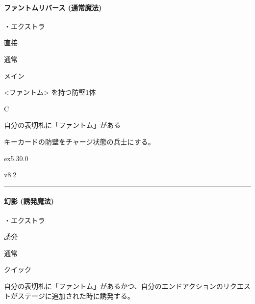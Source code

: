 \documentclass[letterpaper,10pt,dvipdfmx]{sphinxmanual}
\begin{document}
\paragraph{ファントムリバース (通常魔法)}
\label{\detokenize{auto/frameActionlist:act-phantomreverse}}\label{\detokenize{auto/frameActionlist:id40}}
\sphinxAtStartPar
{}

\sphinxAtStartPar
・エクストラ

\sphinxAtStartPar
{} 直接

\sphinxAtStartPar
{} 通常

\sphinxAtStartPar
{} メイン

\sphinxAtStartPar
{} \textless{}ファントム\textgreater{} を持つ防壁1体

\sphinxAtStartPar
{} C

\sphinxAtStartPar
{}

\sphinxAtStartPar
自分の表切札に「ファントム」がある

\sphinxAtStartPar
{}

\sphinxAtStartPar
キーカードの防壁をチャージ状態の兵士にする。

\sphinxAtStartPar
{}  ex5.30.0

\sphinxAtStartPar
{}  v8.2


\bigskip\hrule\bigskip



\paragraph{幻影 (誘発魔法)}
\label{\detokenize{auto/frameActionlist:act-illusion}}\label{\detokenize{auto/frameActionlist:id41}}
\sphinxAtStartPar
{}

\sphinxAtStartPar
・エクストラ

\sphinxAtStartPar
{} 誘発

\sphinxAtStartPar
{} 通常

\sphinxAtStartPar
{} クイック

\sphinxAtStartPar
{}

\sphinxAtStartPar
自分の表切札に「ファントム」があるかつ、自分のエンドアクションのリクエストがステージに追加された時に誘発する。
\end{document}
